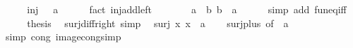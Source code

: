 \begin{isabellebody}
%
\isadelimproof
%
\endisadelimproof
%
\isatagproof
{}\isamarkupfalse%
\ {\isacharminus}{\kern0pt}\isanewline
\ \ \isamarkupfalse%
\ {\isacartoucheopen}inj\ {\isacharparenleft}{\kern0pt}{\isacharparenleft}{\kern0pt}{\isacharplus}{\kern0pt}{\isacharparenright}{\kern0pt}\ {\isacharparenleft}{\kern0pt}{\isacharminus}{\kern0pt}\ a{\isacharparenright}{\kern0pt}{\isacharparenright}{\kern0pt}{\isacartoucheclose}\isanewline
\ \ \ \ \isamarkupfalse%
\ {\isacharparenleft}{\kern0pt}fact\ inj{\isacharunderscore}{\kern0pt}add{\isacharunderscore}{\kern0pt}left{\isacharparenright}{\kern0pt}\isanewline
\ \ \isamarkupfalse%
\ \isamarkupfalse%
\ {\isacartoucheopen}{\isacharparenleft}{\kern0pt}{\isacharplus}{\kern0pt}{\isacharparenright}{\kern0pt}\ {\isacharparenleft}{\kern0pt}{\isacharminus}{\kern0pt}\ a{\isacharparenright}{\kern0pt}\ {\isacharequal}{\kern0pt}\ {\isacharparenleft}{\kern0pt}{\isasymlambda}b{\isachardot}{\kern0pt}\ b\ {\isacharminus}{\kern0pt}\ a{\isacharparenright}{\kern0pt}{\isacartoucheclose}\isanewline
\ \ \ \ \isamarkupfalse%
\ {\isacharparenleft}{\kern0pt}simp\ add{\isacharcolon}{\kern0pt}\ fun{\isacharunderscore}{\kern0pt}eq{\isacharunderscore}{\kern0pt}iff{\isacharparenright}{\kern0pt}\isanewline
\ \ \isamarkupfalse%
\ \isamarkupfalse%
\ {\isacharquery}{\kern0pt}thesis\ \isacommand{{\isachardot}{\kern0pt}}\isamarkupfalse%
\isanewline
{}\isamarkupfalse%
%
\endisatagproof
{\isafoldproof}%
%
\isadelimproof
\isanewline
%
\endisadelimproof
\isanewline
{}\isamarkupfalse%
\ surj{\isacharunderscore}{\kern0pt}diff{\isacharunderscore}{\kern0pt}right\ {\isacharbrackleft}{\kern0pt}simp{\isacharbrackright}{\kern0pt}{\isacharcolon}{\kern0pt}\isanewline
\ \ {\isachardoublequoteopen}surj\ {\isacharparenleft}{\kern0pt}{\isasymlambda}x{\isachardot}{\kern0pt}\ x\ {\isacharminus}{\kern0pt}\ a{\isacharparenright}{\kern0pt}{\isachardoublequoteclose}\isanewline
%
\isadelimproof
\ \ %
\endisadelimproof
%
\isatagproof
{}\isamarkupfalse%
\ surj{\isacharunderscore}{\kern0pt}plus\ {\isacharbrackleft}{\kern0pt}of\ {\isachardoublequoteopen}{\isacharminus}{\kern0pt}\ a{\isachardoublequoteclose}{\isacharbrackright}{\kern0pt}\ \isamarkupfalse%
\ {\isacharparenleft}{\kern0pt}simp\ cong{\isacharcolon}{\kern0pt}\ image{\isacharunderscore}{\kern0pt}cong{\isacharunderscore}{\kern0pt}simp{\isacharparenright}{\kern0pt}%
\endisatagproof
{\isafoldproof}%
%
\isadelimproof
\isanewline
%
\endisadelimproof

\end{isabellebody}
